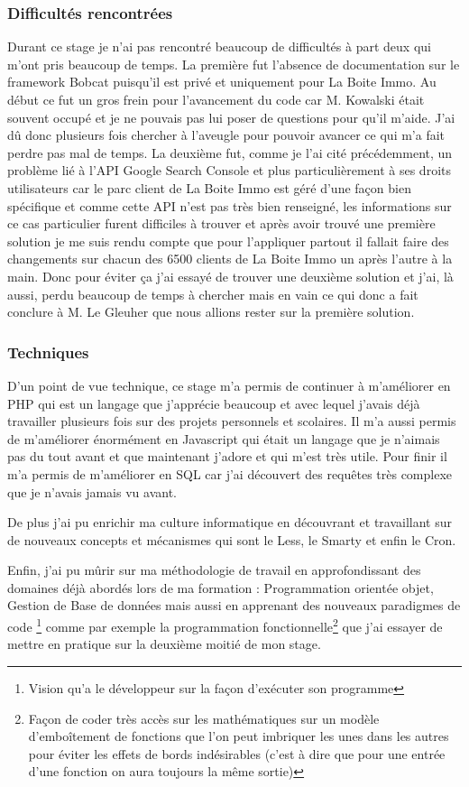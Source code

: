\documentclass[12pt]{article}
\begin{document}
\subsubsection{Difficultés rencontrées}
Durant ce stage je n'ai pas rencontré beaucoup de difficultés à part deux qui m'ont pris beaucoup de temps.
La première fut l'absence de documentation sur le framework Bobcat puisqu'il est privé et uniquement pour La Boite Immo. Au début ce fut un gros frein pour l'avancement du code car M. Kowalski était souvent occupé et je ne pouvais pas lui poser de questions pour qu'il m'aide. J'ai dû donc plusieurs fois chercher à l'aveugle pour pouvoir avancer ce qui m'a fait perdre pas mal de temps.\newline
La deuxième fut, comme je l'ai cité précédemment, un problème lié à l'API Google Search Console et plus particulièrement à ses droits utilisateurs car le parc client de La Boite Immo est géré d'une façon bien spécifique et comme cette API n'est pas très bien renseigné, les informations sur ce cas particulier furent difficiles à trouver et après avoir trouvé une première solution je me suis rendu compte que pour l'appliquer partout il fallait faire des changements sur chacun des 6500 clients de La Boite Immo un après l'autre à la main. Donc pour éviter ça j'ai essayé de trouver une deuxième solution et j'ai, là aussi, perdu beaucoup de temps à chercher mais en vain ce qui donc a fait conclure à M. Le Gleuher que nous allions rester sur la première solution.

\subsubsection{Techniques}
D'un point de vue technique, ce stage m'a permis de continuer à m'améliorer en PHP qui est un langage que j'apprécie beaucoup et avec lequel j'avais déjà travailler plusieurs fois sur des projets personnels et scolaires. Il m'a aussi permis de m'améliorer énormément en Javascript qui était un langage que je n'aimais pas du tout avant et que maintenant j'adore et qui m'est très utile. Pour finir il m'a permis de m'améliorer en SQL car j'ai découvert des requêtes très complexe que je n'avais jamais vu avant.

De plus j'ai pu enrichir ma culture informatique en découvrant et travaillant sur de nouveaux concepts et mécanismes qui sont le Less, le Smarty et enfin le Cron.

Enfin, j'ai pu mûrir sur ma méthodologie de travail en approfondissant des domaines déjà abordés lors de ma formation : Programmation orientée objet, Gestion de Base de données mais aussi en apprenant des nouveaux paradigmes de code \footnote{Vision qu'a le développeur sur la façon d'exécuter son programme} comme par exemple la programmation fonctionnelle\footnote{Façon de coder très accès sur les mathématiques sur un modèle d'emboîtement de fonctions que l'on peut imbriquer les unes dans les autres pour éviter les effets de bords indésirables (c'est à dire que pour une entrée d'une fonction on aura toujours la même sortie)} que j'ai essayer de mettre en pratique sur la deuxième moitié de mon stage.
\end{document}
